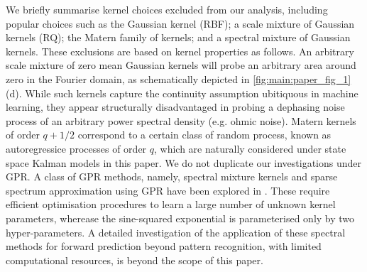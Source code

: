 We briefly summarise kernel choices excluded from our analysis, including popular choices such as the Gaussian kernel (RBF); a scale mixture of Gaussian kernels (RQ); the Matern family of kernels; and a spectral mixture of Gaussian kernels. These exclusions are based on kernel properties as follows. An arbitrary scale mixture of zero mean Gaussian kernels will probe an arbitrary area around zero in the Fourier domain, as schematically depicted in \cref{fig:main:paper_fig_1}(d). While such kernels capture the continuity assumption ubitiquous in machine learning, they appear structurally disadvantaged in probing a dephasing noise process of an arbitrary power spectral density (e.g. ohmic noise).  Matern kernels of order $q + 1/2$ correspond to a certain class of random process, known as autoregressice processes of order $q$, which are naturally considered under state space Kalman models in this paper. We do not duplicate our investigations under GPR. A class of GPR methods, namely, spectral mixture kernels and sparse spectrum approximation using GPR have been explored in \cite{wilson2013, quia2010}. These require efficient optimisation procedures to learn a large number of unknown kernel parameters, wherease the sine-squared exponential is parameterised only by two hyper-parameters. A detailed investigation of the application of these spectral methods for forward prediction beyond pattern recognition, with limited computational resources, is beyond the scope of this paper.  

